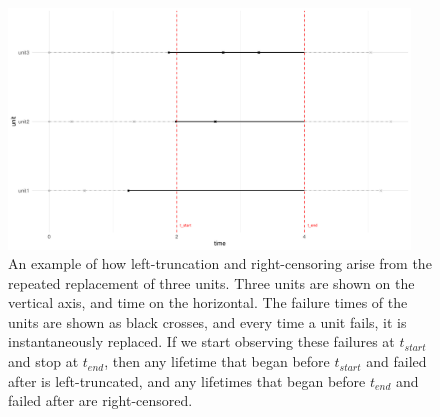 \begin{figure}
    \centering
    \includegraphics[width=0.95\textwidth]{./figures/ch-2/left_truncation_w_right_censoring_example.pdf}
    \caption{An example of how left-truncation and right-censoring arise from the repeated replacement of three units. Three units are shown on the vertical axis, and time on the horizontal. The failure times of the units are shown as black crosses, and every time a unit fails, it is instantaneously replaced. If we start observing these failures at $t_{start}$ and stop at $t_{end}$, then any lifetime that began before $t_{start}$ and failed after is left-truncated, and any lifetimes that began before $t_{end}$ and failed after are right-censored.}
    \label{fig:left_trunc_and_right_cens_example}
\end{figure}

